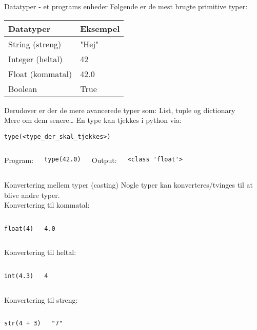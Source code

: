 \begin{frame}[fragile]{Datatyper - et programs enheder}
	Følgende er de mest brugte primitive typer: 
	\begin{center}
		\begin{tabular}{ll}
		\hline
		Datatyper			&		Eksempel 	\\ \hline \hline
		String (streng)		&		"Hej"		\\
		Integer (heltal)	&		42			\\
		Float (kommatal)	&		42.0		\\
		Boolean				&		True		\\
		\end{tabular}
	\end{center}
	Derudover er der de mere avancerede typer som: List, tuple og dictionary\\
	Mere om dem senere\dots
	En type kan tjekkes i python via:
	\begin{lstlisting}[style=python]
type(<type_der_skal_tjekkes>)
	\end{lstlisting}
	\begin{columns}
		Program:
		\begin{lstlisting}[style=python]
	type(42.0)
		\end{lstlisting}
		Output:
		\begin{lstlisting}[style=python]
	<class 'float'>
		\end{lstlisting}
	\end{columns}
\end{frame}

\begin{frame}[fragile]{Konvertering mellem typer (casting)}
	Nogle typer kan konverteres/tvinges til at blive andre typer.\\
	Konvertering til kommatal:
	\begin{columns}
		\column{0.4\textwidth}
		\begin{lstlisting}[style=python]
float(4)
		\end{lstlisting}
		\column{0.4\textwidth}
		\begin{lstlisting}[style=python]
4.0
		\end{lstlisting}
	\end{columns}
	Konvertering til heltal:
	\begin{columns}
		\begin{lstlisting}[style=python]
int(4.3)
		\end{lstlisting}
		\begin{lstlisting}[style=python]
4
		\end{lstlisting}
	\end{columns}
	Konvertering til streng:
	\begin{columns}
		\column{0.4\textwidth}
		\begin{lstlisting}[style=python]
str(4 + 3)
		\end{lstlisting}
		\column{0.4\textwidth}
		\begin{lstlisting}[style=python]
"7"
		\end{lstlisting}
	\end{columns}
\end{frame}

